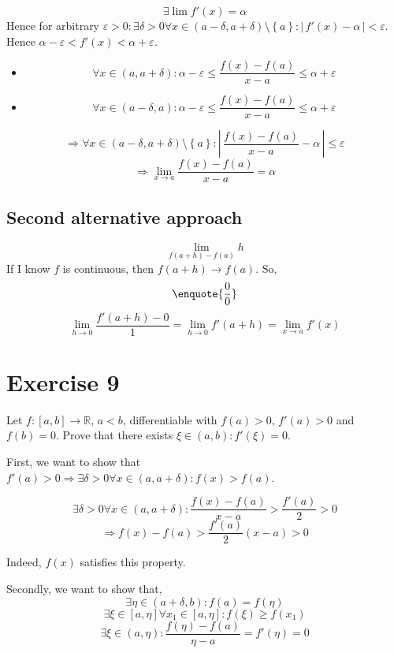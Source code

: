\documentclass[a4paper]{article}
\theoremstyle{definition}
\newcommand\abs[1]{\left|\,#1\,\right|}
\newcommand\set[1]{\left\{#1\right\}}
\begin{document}
\[ \exists \lim{f'(x)} = \alpha \]
Hence for arbitrary $\varepsilon > 0: \exists \delta > 0 \forall x \in (a - \delta, a + \delta) \setminus \set{a}: \abs{f'(x) - \alpha} < \varepsilon$.
Hence $\alpha - \varepsilon < f'(x) < \alpha + \varepsilon$.

\begin{itemize}
  \item
    \[
      \forall x \in (a, a + \delta):
      \alpha - \varepsilon \leq \frac{f(x) - f(a)}{x - a} \leq \alpha + \varepsilon
    \]
  \item
    \[
      \forall x \in (a - \delta, a):
      \alpha - \varepsilon \leq \frac{f(x) - f(a)}{x - a} \leq \alpha + \varepsilon
    \]
\end{itemize}

\[ \Rightarrow \forall x \in (a - \delta, a + \delta) \setminus \set{a}: \abs{\frac{f(x) - f(a)}{x - a} - \alpha} \leq \varepsilon \]
\[ \Rightarrow \lim_{x\to a} \frac{f(x) - f(a)}{x - a} = \alpha \]

\subsection{Second alternative approach}
%
\[
  \lim_{f(a + h) - f(a)}{h}
\]
If I know $f$ is continuous, then $f(a + h) \to f(a)$. So,
\[ \enquote{\frac 00} \]
\[ \lim_{h\to 0} \frac{f'(a + h) - 0}{1} = \lim_{h\to0} f'(a + h) = \lim_{x\to a} f'(x) \]

\section{Exercise 9}
\begin{ex}
  Let $f: [a,b] \to \mathbb R$, $a < b$, differentiable with $f(a) > 0$, $f'(a) > 0$ and $f(b) = 0$.
  Prove that there exists $\xi \in (a,b): f'(\xi) = 0$.
\end{ex}

First, we want to show that $f'(a) > 0 \Rightarrow \exists \delta > 0 \forall x \in (a, a + \delta): f(x) > f(a)$.

\[ \exists \delta > 0 \forall x \in (a, a + \delta): \frac{f(x) - f(a)}{x - a} > \frac{f'(a)}{2} > 0 \]
\[ \Rightarrow f(x) - f(a) > \frac{f'(a)}{2} (x - a) > 0 \]

Indeed, $f(x)$ satisfies this property.

Secondly, we want to show that,
\[ \exists \eta \in (a + \delta, b): f(a) = f(\eta) \]
\[ \exists \xi \in [a,\eta] \forall x_1 \in [a,\eta]: f(\xi) \geq f(x_1) \]
\[ \exists \xi \in (a, \eta): \frac{f(\eta) - f(a)}{\eta - a} = f'(\eta) = 0 \]
\end{document}
